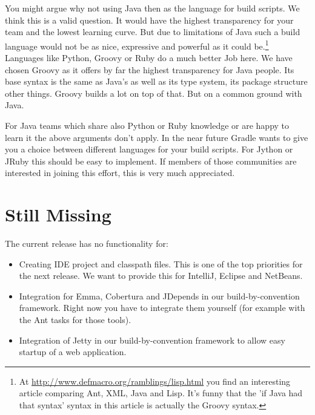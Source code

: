 You might argue why not using Java then as the language for build scripts. We think this is a valid question. It would have the highest transparency for your team and the lowest learning curve. But due to limitations of Java such a build language would not be as nice, expressive and powerful as it could be.\footnote{At \url{http://www.defmacro.org/ramblings/lisp.html} you find an interesting article comparing Ant, XML, Java and Lisp. It's funny that the 'if Java had that syntax' syntax in this article is actually the Groovy syntax.} Languages like Python, Groovy or Ruby do a much better Job here. We have chosen Groovy as it offers by far the highest transparency for Java people. Its base syntax is the same as Java's as well as its type system, its package structure other things. Groovy builds a lot on top of that. But on a common ground with Java.

For Java teams which share also Python or Ruby knowledge or are happy to learn it the above arguments don't apply. In the near future Gradle wants to give you a choice between different languages for your build scripts. For Jython or JRuby this should be easy to implement. If members of those communities are interested in joining this effort, this is very much appreciated. 

\section{Still Missing} %
\label{sec:still_missing}
The current release has no functionality for:
\begin{itemize}
	\item Creating IDE project and classpath files. This is one of the top priorities for the next release. We want to provide this for IntelliJ, Eclipse and NetBeans.
	\item Integration for Emma, Cobertura and JDepends in our build-by-convention framework. Right now you have to integrate them yourself (for example with the Ant tasks for those tools).
	\item Integration of Jetty in our build-by-convention framework to allow easy startup of a web application. 
\end{itemize}

